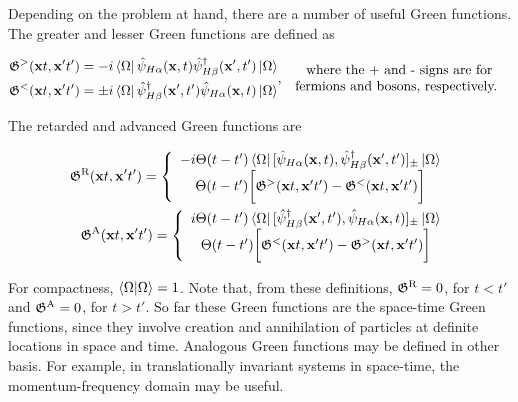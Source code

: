\documentclass{homework}
\begin{document}
Depending on the problem at hand, there are a number of useful Green functions. The greater and lesser Green functions are defined as 

\begin{equation}
    \begin{split}
       \mathfrak{G}^{>}({\bf x}t, {\bf x}' t') = -i \bra{\Omega}\hat{\psi}_{H \alpha}({\bf x}, t) \hat{\psi}^\dagger_{H \beta}({\bf x}', t') \ket{\Omega}
        \\
       \mathfrak{G}^{<}({\bf x}t, {\bf x}' t') = \pm i \bra{\Omega} \hat{\psi}^\dagger_{H \beta}({\bf x}', t') \hat{\psi}_{H \alpha}({\bf x}, t) \ket{\Omega}
    \end{split}, \begin{array}{c}
         \textnormal{ where the + and - signs are for}  \\
         \textnormal{ fermions and bosons, respectively. }
    \end{array}
\end{equation}

The retarded and advanced Green functions are 

\begin{equation}
    \begin{split}
         \mathfrak{G}^{\textnormal{R}}({\bf x}t, {\bf x}' t') = \left\{\begin{array}{c}
              -i \Theta(t-t')  \bra{\Omega}[\hat{\psi}_{H \alpha}({\bf x}, t),  \hat{\psi}^\dagger_{H \beta}({\bf x}', t')]_{\pm} \ket{\Omega}   \\
              \Theta(t-t') \bigg[\mathfrak{G}^{>}({\bf x}t, {\bf x}' t') - \mathfrak{G}^{<}({\bf x}t, {\bf x}' t')\bigg]
         \end{array} \right. \\
         \mathfrak{G}^{\textnormal{A}}({\bf x}t, {\bf x}' t') = \left\{\begin{array}{c}
              i \Theta(t-t')  \bra{\Omega}[\hat{\psi}^\dagger_{H \beta}({\bf x}', t'), \hat{\psi}_{H \alpha}({\bf x}, t)]_{\pm} \ket{\Omega}   \\
              \Theta(t-t') \bigg[\mathfrak{G}^{<}({\bf x}t, {\bf x}' t') - \mathfrak{G}^{>}({\bf x}t, {\bf x}' t')\bigg]
         \end{array} \right. 
 \end{split}
\end{equation}

For compactness, $\bra{\Omega} \ket{\Omega} = 1$. Note that, from these definitions, $ \mathfrak{G}^{\textnormal{R}} = 0$, for $t < t'$ and $ \mathfrak{G}^{\textnormal{A}} = 0$, for $t > t'$. So far these Green functions are the space-time Green functions, since they involve creation and annihilation of particles at definite locations in space and time. Analogous Green functions may be defined in other basis. For example, in translationally invariant systems in space-time, the momentum-frequency domain may be useful. \\
\end{document}
